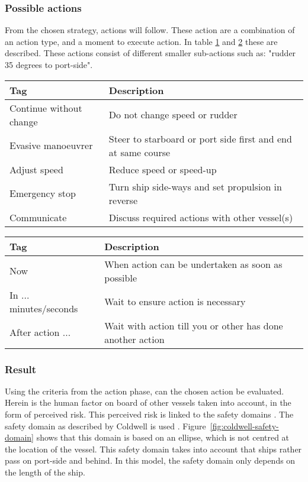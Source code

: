 \subsubsection{Possible actions}
From the chosen strategy, actions will follow. These action are a combination of an action type, and a moment to execute action. In table \ref{tab:actions} and \ref{tab:time-domain-action} these are described. These actions consist of different smaller sub-actions such as: "rudder 35 degrees to port-side". 
\begin{table}[H]
	\begin{tabular}{p{}|p{}}
		\toprule
		Tag & Description\\
		\midrule
		Continue without change & Do not change speed or rudder\\
		Evasive manoeuvrer & Steer to starboard or port side first and end at same course\\
		Adjust speed & Reduce speed or speed-up \\
		Emergency stop & Turn ship side-ways and set propulsion in reverse\\
		Communicate & Discuss required actions with other vessel(s)\\
		\bottomrule
	\end{tabular}
	
	\label{tab:actions}
\end{table}

\begin{table}[H]
	\begin{tabular}{p{}|p{}}
		\toprule
		Tag & Description\\
		\midrule
		Now & When action can be undertaken as soon as possible \\
		In ... minutes/seconds & Wait to ensure action is necessary \\
		After action ... & Wait with action till you or other has done another action \\
		\bottomrule
	\end{tabular}
	
	\label{tab:time-domain-action}
\end{table}

\subsubsection{Result}
Using the criteria from the action phase, can the chosen action be evaluated. Herein is the human factor on board of other vessels taken into account, in the form of perceived risk. This perceived risk is linked to the safety domains \cite{Szlapczynski2017a}. The safety domain as described by Coldwell is used \cite{Coldwell1983}. Figure~\ref{fig:coldwell-safety-domain} shows that this domain is based on an ellipse, which is not centred at the location of the vessel. This safety domain takes into account that ships rather pass on port-side and behind. In this model, the safety domain only depends on the length of the ship.

